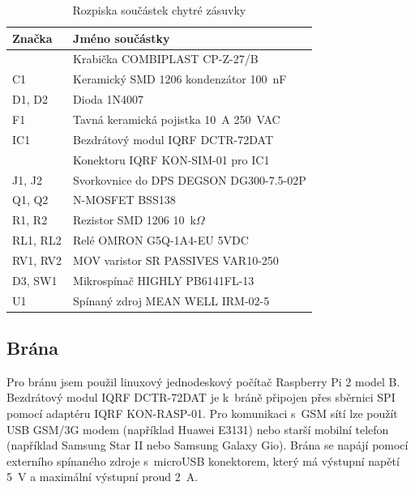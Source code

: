 \documentclass[12pt,a4paper,oneside]{article}
\begin{document}
\begin{table}[H]
  \centering
  \begin{tabular}{|l|l|}
    \hline
    \textbf{Značka} & \textbf{Jméno součástky} \\
    \hline
    \hline
    ~ & Krabička COMBIPLAST CP-Z-27/B \\
    \hline
    C1 & Keramický SMD 1206 kondenzátor 100~nF \\
    \hline
    D1, D2 & Dioda 1N4007 \\
    \hline
    F1 & Tavná keramická pojistka 10~A 250~VAC \\
    \hline
    IC1 & Bezdrátový modul IQRF DCTR-72DAT \\
    \hline
    ~ & Konektoru IQRF KON-SIM-01 pro IC1 \\
    \hline
    J1, J2 & Svorkovnice do DPS\index[zkr]{DPS!Deska plošných spojů|textit} DEGSON DG300-7.5-02P \\
    \hline
    Q1, Q2 & N-MOSFET BSS138 \\
    \hline
    R1, R2 & Rezistor SMD 1206 10~k$\Omega$ \\
    \hline
    RL1, RL2 & Relé OMRON G5Q-1A4-EU 5VDC \\
    \hline
    RV1, RV2 & MOV varistor SR PASSIVES VAR10-250 \\
    \hline
    D3, SW1 & Mikrospínač HIGHLY PB6141FL-13 \\
    \hline
    U1 & Spínaný zdroj MEAN WELL IRM-02-5 \\
    \hline
  \end{tabular}
  \caption{Rozpiska součástek chytré zásuvky}\label{table:rozpiska-soucastek}
\end{table}

\newpage

\subsection{Brána}

Pro bránu jsem použil linuxový jednodeskový počítač Raspberry Pi 2 model B. Bezdrátový modul IQRF DCTR-72DAT je k~bráně připojen přes sběrnici SPI pomocí adaptéru IQRF KON-RASP-01. Pro komunikaci s~GSM sítí lze použít USB GSM/3G modem (například Huawei E3131) nebo starší mobilní telefon (například Samsung Star II nebo Samsung Galaxy Gio). Brána se napájí pomocí externího spínaného zdroje s~microUSB konektorem, který má výstupní napětí 5~V a maximální výstupní proud 2~A.
\end{document}
